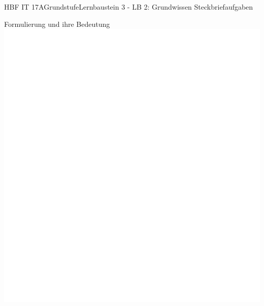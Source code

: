 \documentclass[oneside,openany,headings=optiontotoc,11pt,numbers=noenddot]{scrreprt}
\begin{document}
\begin{worksheet}{HBF IT 17A}{Grundstufe}{Lernbaustein 3 - LB 2: Grundwissen Steckbriefaufgaben}
\begin{framed}
		\end{framed}
		\begin{framed}
			\tiny{\color{codegray}Formulierung und ihre Bedeutung}\\
			\includegraphics[scale=0.93]{../empty.jpg}
		\end{framed}
	\end{worksheet}
\end{document}
